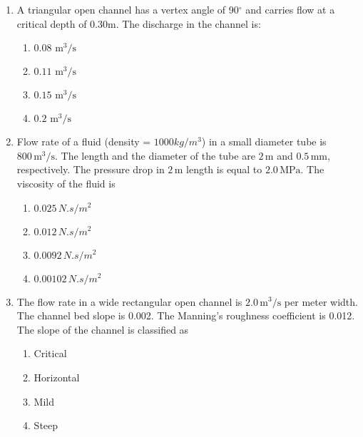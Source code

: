 \documentclass[journal]{IEEEtran}
\begin{document}
    \begin{enumerate}
    \item{
          	A triangular open channel has a vertex angle of 90$^\circ$ and carries flow at a critical depth of 0.30m. The discharge in the channel is:\ \text{  }\hfill
                
            \begin{multicols}{4}
				\begin{enumerate}
					\item $0.08 \text{ m}^3/\text{s}$ 
					
					\item $0.11 \text{ m}^3/\text{s}$ 
					
					\item $0.15 \text{ m}^3/\text{s}$ 
					
					\item $0.2 \text{ m}^3/\text{s}$
				\end{enumerate}
			\end{multicols}
            }
    \item{
            Flow rate of a fluid (density = $1000 kg/m^3$) in a small diameter tube is $800 \, \text{m}^3/\text{s}$. The length and the diameter of the tube are $2 \, \text{m}$ and $0.5 \, \text{mm}$, respectively. The pressure drop in $2 \, \text{m}$ length is equal to $2.0 \, \text{MPa}$. The viscosity of the fluid is\hfill
                
            \begin{multicols}{4}
                \begin{enumerate}
                    \item $0.025 \, {N.s}/{m^2}$
                    \item $0.012 \, {N.s}/{m^2}$
                    \item $0.0092 \, {N.s}/{m^2}$
                    \item $0.00102 \, {N.s}/{m^2}$
                \end{enumerate}
            \end{multicols}
        }
\item{
        	
        	The flow rate in a wide rectangular open channel is $2.0 \, \text{m}^3/\text{s}$ per meter width. The channel bed slope is 0.002. The Manning’s roughness coefficient is 0.012. The slope of the channel is classified as
        	\hfill
        	
        	\begin{multicols}{4}
        		\begin{enumerate}
        			\item Critical  
        			\item Horizontal  
        			\item Mild  
        			\item Steep  
        		\end{enumerate}
        	\end{multicols}
        	
}
\end{enumerate}
\end{document}
